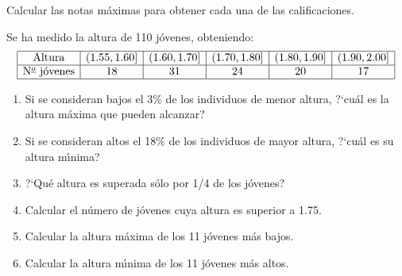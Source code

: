 \documentclass[hidequestions]{homework}
\begin{document}
	Calcular las notas m{\'a}ximas para obtener cada una de las calificaciones. \\
	
	\color{black}
	
	
	
	
	\problem
	Se ha medido la altura de 110 j{\'o}venes, obteniendo:
	$$
	\begin{array}{|c|c|c|c|c|c|c|c|c|c|} \hline
	\mbox{Altura}     & (1\mbox{.}55,1\mbox{.}60] &
	(1\mbox{.}60,1\mbox{.}70] & (1\mbox{.}70,1\mbox{.}80] &
	(1\mbox{.}80,1\mbox{.}90] & (1\mbox{.}90,2\mbox{.}00] \\ \hline
	\mbox{N${}^{\underline{o}}$ j{\'o}venes} & 18 & 31     &  24       &
	20    &  17  \\ \hline
	\end{array}
	$$
	
	\begin{enumerate}
		\item Si se consideran bajos el 3\% de los individuos de menor  altura,
		?`cu{\'a}l es la altura m{\'a}xima que pueden alcanzar?
		\item Si se consideran altos el 18\% de los individuos de mayor  altura,
		?`cu{\'a}l es su altura m{\'\i}nima?
		\item ?`Qu{\'e} altura es superada s{\'o}lo por 1/4 de los j{\'o}venes?
		\item Calcular el n{\'u}mero de j{\'o}venes cuya altura es superior a 1.75.
		\item Calcular la altura m{\'a}xima de los 11 j{\'o}venes m{\'a}s bajos.
		\item Calcular la altura m{\'\i}nima de los 11 j{\'o}venes m{\'a}s altos. \\
	\end{enumerate}
	
	\color{black}
	
	
	
	
\end{document}
